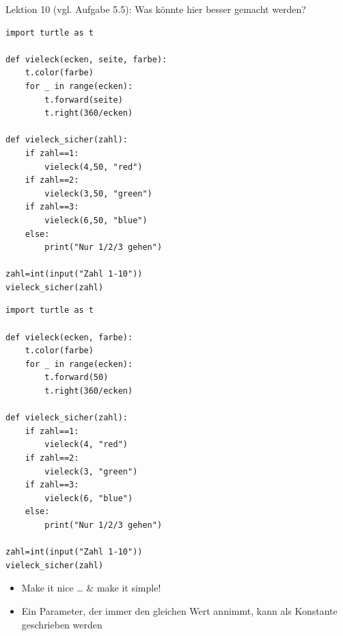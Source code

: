 \begin{frame}[fragile]{Lektion 10}
 (vgl. Aufgabe 5.5): Was könnte hier besser gemacht werden?\\[-.5cm]
\begin{minipage}[t]{.45\textwidth}
    \begin{lstlisting}[basicstyle=\tiny\ttfamily]
import turtle as t

def vieleck(ecken, seite, farbe):
    t.color(farbe)
    for _ in range(ecken):
        t.forward(seite)
        t.right(360/ecken)

def vieleck_sicher(zahl):
    if zahl==1:
        vieleck(4,50, "red")
    if zahl==2:
        vieleck(3,50, "green")
    if zahl==3:
        vieleck(6,50, "blue")
    else:
        print("Nur 1/2/3 gehen")

zahl=int(input("Zahl 1-10"))
vieleck_sicher(zahl)
\end{lstlisting}
\end{minipage}
\begin{minipage}[t]{.45\textwidth}
    \begin{lstlisting}[basicstyle=\tiny\ttfamily]
import turtle as t

def vieleck(ecken, farbe):
    t.color(farbe)
    for _ in range(ecken):
        t.forward(50)
        t.right(360/ecken)

def vieleck_sicher(zahl):
    if zahl==1:
        vieleck(4, "red")
    if zahl==2:
        vieleck(3, "green")
    if zahl==3:
        vieleck(6, "blue")
    else:
        print("Nur 1/2/3 gehen")

zahl=int(input("Zahl 1-10"))
vieleck_sicher(zahl)
\end{lstlisting}
    \begin{itemize}
        \item Make it nice \ldots{} \& make it simple! 
        \item Ein Parameter, der immer den gleichen Wert annimmt, kann als Konstante geschrieben werden
    \end{itemize}
\end{minipage}
\end{frame}


